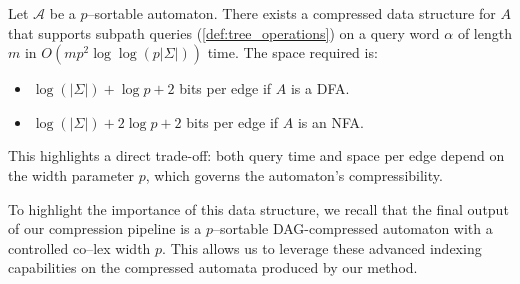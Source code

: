 \begin{theorem}
    \label{thm:indexing}
    Let $\mathcal{A}$ be a $p$--sortable automaton. There exists a compressed data structure for $A$ that supports subpath queries (\cref{def:tree_operations}) on a query word $\alpha$ of length $m$ in $O(mp^2\log\log(p|\Sigma|))$ time. The space required is:
    \begin{itemize}
        \item $\log(|\Sigma|) + \log p + 2$ bits per edge if $A$ is a DFA.
        \item $\log(|\Sigma|) + 2\log p + 2$ bits per edge if $A$ is an NFA.
    \end{itemize}
\end{theorem}
This highlights a direct trade-off: both query time and space per edge depend on the width parameter $p$, which governs the automaton's compressibility.

To highlight the importance of this data structure, we recall that the final output of our compression pipeline is a $p$--sortable DAG-compressed automaton with a controlled co--lex width $p$. This allows us to leverage these advanced indexing capabilities on the compressed automata produced by our method.